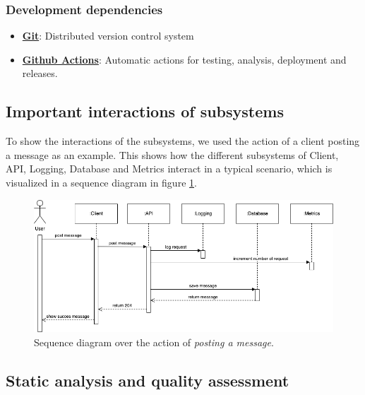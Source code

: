 \documentclass{article}
\begin{document}
\subsubsection{Development dependencies}
\begin{itemize}
    \item \href{https://git-scm.com/}{\textbf{Git}}: Distributed version control system
    \item \href{https://github.com/features/actions}{\textbf{Github Actions}}: Automatic actions for testing, analysis, deployment and releases.
\end{itemize}

\subsection{Important interactions of subsystems}
To show the interactions of the subsystems, we used the action of a client posting a message as an example. This shows how the different subsystems of Client, API, Logging, Database and Metrics interact in a typical scenario, which is visualized in a sequence diagram in figure \ref{fig:sequence-diagram}.

\begin{figure}[H]
   \centering
   \includegraphics[width=\textwidth]{minitwit-system-architecture-1-sequence diagram.drawio.png}
   \caption{Sequence diagram over the action of \textit{posting a message}.}
   \label{fig:sequence-diagram}
\end{figure}


\subsection{Static analysis and quality assessment}
\end{document}
